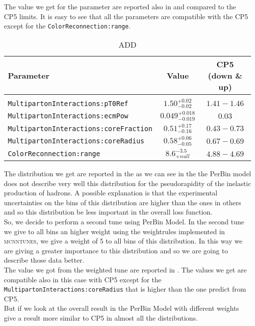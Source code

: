 \noindent The value we get for the parameter are reported also in  and compared to the CP5 limits. 
It is easy to see that all the parameters are compatible with the CP5 except for the \texttt{ColorReconnection:range}. 
\begin{table}[!htb]
\centering
	\begin{tabular}{l | c | c}
		Parameter & Value & CP5 (down \& up)\\ \hline\hline
		\\[-0.85em]		
\texttt{MultipartonInteractions:pT0Ref} & $ 1.50^{+0.02}_{-0.02}$ & $1.41 - 1.46$\\[3pt]
\texttt{MultipartonInteractions:ecmPow} & $ 0.049_{-0.019}^{+0.018} $ & $0.03$\\[3pt]
\texttt{MultipartonInteractions:coreFraction} & $ 0.51_{-0.16}^{+0.17} $ & $0.43 - 0.73$\\[3pt]
\texttt{MultipartonInteractions:coreRadius} & $ 0.58_{-0.05}^{+0.06} $ & $0.67 - 0.69$\\[3pt]
\texttt{ColorReconnection:range} & $ 8.6 ^{-3.5}_{+null} $ & $4.88 - 4.69$\\[2pt]
\end{tabular}
\caption{ADD}
\label{table:result_PerBin_5params}
\end{table}

The distribution we get are reported in the  as we can see in the  the PerBin model does not describe very well this distribution for the pseudorapidity of the inelastic production of hadrons. A possible explanation is that the experimental uncertainties on the bins of this distribution are higher than the ones in others and so this distribution be less important in the overall loss function.
\\
So, we decide to perform a second tune using PerBin Model. In the second tune we give to all  bins an higher weight using the weightrules implemented in \textsc{mcnntunes}, we give a weight of 5 to all bins of this distribution. In this way we are giving a greater importance to this distribution and so we are going to describe those data better.
\\
The value we got from the weighted tune are reported in . The values we get are compatible also in this case with CP5 except for the \mbox{\texttt{MultipartonInteractions:coreRadius}} that is higher than the one predict from CP5.
\\
But if we look at the overall result in 
the PerBin Model with different weights give a result more similar to CP5 in almost all the distributions. 

